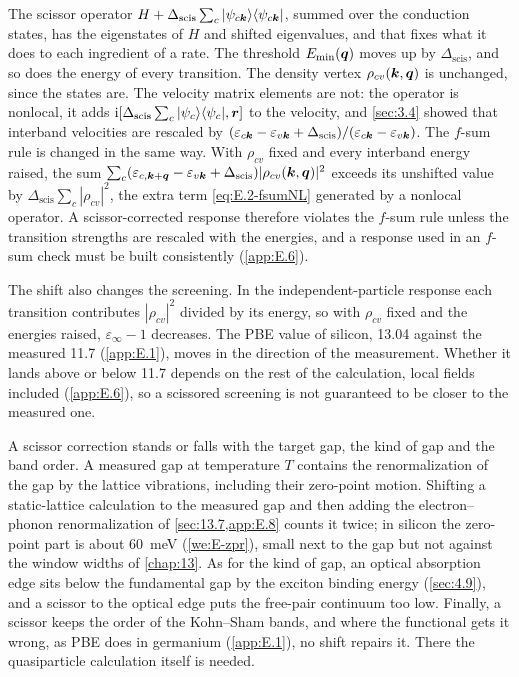 The scissor operator $H + \Delta_{\mathrm{scis}}\sum_{c}|\psi_{c\bm{k}}\rangle\langle\psi_{c\bm{k}}|$, summed over the conduction states, has the eigenstates of $H$ and shifted eigenvalues, and that fixes what it does to each ingredient of a rate. The threshold $E_{\mathrm{min}}(\bm{q})$ moves up by $\Delta_{\mathrm{scis}}$, and so does the energy of every transition. The density vertex $\rho_{cv}(\bm{k}, \bm{q})$ is unchanged, since the states are. The velocity matrix elements are not: the operator is nonlocal, it adds $\mathrm{i}[\Delta_{\mathrm{scis}}\sum_c|\psi_c\rangle\langle\psi_c|, \bm{r}]$ to the velocity, and \cref{sec:3.4} showed that interband velocities are rescaled by $(\varepsilon_{c\bm{k}} - \varepsilon_{v\bm{k}} + \Delta_{\mathrm{scis}})/(\varepsilon_{c\bm{k}} - \varepsilon_{v\bm{k}})$. The $f$-sum rule is changed in the same way. With $\rho_{cv}$ fixed and every interband energy raised, the sum $\sum_c(\varepsilon_{c,\bm{k}+\bm{q}} - \varepsilon_{v\bm{k}} + \Delta_{\mathrm{scis}})|\rho_{cv}(\bm{k}, \bm{q})|^2$ exceeds its unshifted value by $\Delta_{\mathrm{scis}}\sum_c|\rho_{cv}|^2$, the extra term \cref{eq:E.2-fsumNL} generated by a nonlocal operator. A scissor-corrected response therefore violates the $f$-sum rule unless the transition strengths are rescaled with the energies, and a response used in an $f$-sum check must be built consistently (\cref{app:E.6}).

The shift also changes the screening. In the independent-particle response each transition contributes $|\rho_{cv}|^2$ divided by its energy, so with $\rho_{cv}$ fixed and the energies raised, $\varepsilon_\infty - 1$ decreases. The PBE value of silicon, 13.04 against the measured 11.7 (\cref{app:E.1}), moves in the direction of the measurement. Whether it lands above or below 11.7 depends on the rest of the calculation, local fields included (\cref{app:E.6}), so a scissored screening is not guaranteed to be closer to the measured one.

A scissor correction stands or falls with the target gap, the kind of gap and the band order. A measured gap at temperature $T$ contains the renormalization of the gap by the lattice vibrations, including their zero-point motion. Shifting a static-lattice calculation to the measured gap and then adding the electron--phonon renormalization of \cref{sec:13.7,app:E.8} counts it twice; in silicon the zero-point part is about \SI{60}{meV} (\cref{we:E-zpr}), small next to the gap but not against the window widths of \cref{chap:13}. As for the kind of gap, an optical absorption edge sits below the fundamental gap by the exciton binding energy (\cref{sec:4.9}), and a scissor to the optical edge puts the free-pair continuum too low. Finally, a scissor keeps the order of the Kohn--Sham bands, and where the functional gets it wrong, as PBE does in germanium (\cref{app:E.1}), no shift repairs it. There the quasiparticle calculation itself is needed.

